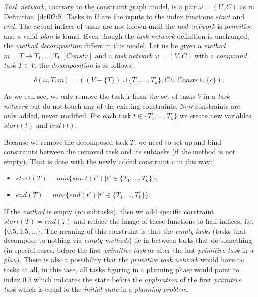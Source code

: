 \medskip\noindent
\emph{Task network}, contrary to the constraint graph model, is a pair $\omega = (U, C)$ as in Definition~\ref{def02:9}. Tasks in $U$ are the inputs to the index functions $start$ and $end$. The actual indices of tasks are not known until the \emph{task network} is \emph{primitive} and a valid \emph{plan} is found. Even though the \emph{task network} definition is unchanged, the \emph{method decomposition} differs in this model. Let us be given a \emph{method} $m = T \rightarrow T_1, \dots, T_k \; [Constr]$ and a \emph{task network} $\omega = (V, C)$ with a \emph{compound task} $T \in V$, the \emph{decomposition} is as follows:

\[
\delta(\omega, T, m) = ((V - \{ T \}) \cup \{ T_1, \dots, T_k \}, C \cup Constr \cup \{c\}).
\]

\noindent
As we can see, we only remove the task $T$ from the set of tasks $V$ in a \emph{task network} but do not touch any of the existing constraints. New constraints are only added, never modified. For each task $t \in \{ T_1, \dots, T_k \}$ we create new variables $start(t)$ and $end(t)$. 

\noindent
Because we remove the decomposed task $T$, we need to set up and bind constraints between the removed task and its subtasks (if the method is not empty). That is done with the newly added constraint $c$ in this way:

\begin{itemize}
    \item $start(T) = min\{ start(t') | t' \in \{ T_1, \dots, T_k \}\}$,

    \item $end(T) = max\{ end(t') | t' \in \{ T_1, \dots, T_k \}\}$.
\end{itemize}

\noindent
If the \emph{method} is empty (no subtasks), then we add specific constraint $start(T) = end(T)$ and reduce the image of these functions to half-indices, i.e. $\{ 0.5, 1.5, \dots\}$. The meaning of this constraint is that the \emph{empty tasks} (tasks that decompose to nothing via \emph{empty methods}) lie in between tasks that do something (in special cases, before the first \emph{primitive task} or after the last \emph{primitive task} in a \emph{plan}). There is also a possibility that the \emph{primitive task network} would have no tasks at all, in this case, all tasks figuring in a planning phase would point to index $0.5$ which indicates the state before the \emph{application} of the first \emph{primitive task} which is equal to the \emph{initial state} in a \emph{planning problem}.

